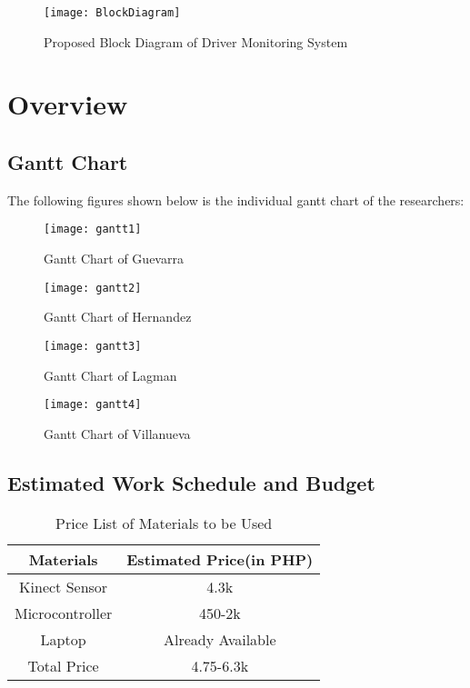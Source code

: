 \begin{center}
	\begin{figure}[ht]
		\centering
		\texttt{[image: BlockDiagram]}
		\caption{Proposed Block Diagram of Driver Monitoring System}
	\end{figure}
\end{center}
\newpage
\section{Overview}

\subsection{Gantt Chart}
The following figures shown below is the individual gantt chart of the researchers:

\begin{figure}[!htb]
	\centering
	\texttt{[image: gantt1]}
	\caption{Gantt Chart of Guevarra}
\end{figure}
\begin{figure}[!htb]
	\centering
	\texttt{[image: gantt2]}
	\caption{Gantt Chart of Hernandez}
\end{figure}
\begin{figure}[!htb]
	\centering
	\texttt{[image: gantt3]}
	\caption{Gantt Chart of Lagman}
\end{figure}
\begin{figure}[!htb]
	\centering
	\texttt{[image: gantt4]}
	\caption{Gantt Chart of Villanueva}
\end{figure}
\newpage
\newpage
\subsection{Estimated Work Schedule and Budget}
\begin{table}[!htb]
	\caption{Price List of Materials to be Used}
	\centering
	\begin{tabular}{|c|c|}
		\hline
		Materials & Estimated Price(in PHP) \\
		\hline
		Kinect Sensor & 4.3k \\
		\hline
		Microcontroller & 450-2k \\
		\hline
		Laptop & Already Available \\
		\hline
		Total Price & 4.75-6.3k \\
		\hline
	\end{tabular}
\end{table}